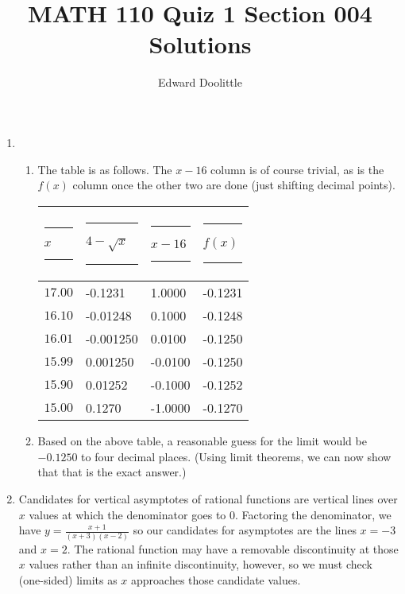 \documentclass{article}
\title{MATH 110 Quiz 1 Section 004 Solutions}
\author{Edward Doolittle}
\newcommand{\ds}{\displaystyle}
\begin{document}
\maketitle
\begin{enumerate}
\item
  \begin{enumerate}
  \item The table is as follows.  The $x-16$ column is of course trivial,
    as is the $f(x)$ column once the other two are done (just shifting
    decimal points).
    \begin{center}
      \begin{tabular}{|l|l|l|l|}
        \hline
	\rule{10pt}{0pt}$x$\rule{10pt}{0pt}     
	  & \rule{10pt}{0pt}\rule{0pt}{12pt}$4-\sqrt{x}$\rule{10pt}{0pt}
	  & \rule{10pt}{0pt}$x-16$\rule{10pt}{0pt}
	  & \rule{20pt}{0pt}$f(x)$\rule{20pt}{0pt} \\
	\hline
	\rule{0pt}{12pt}$17.00$ &   -0.1231    & 1.0000 &  -0.1231   \\
	\hline
	\rule{0pt}{12pt}$16.10$ &   -0.01248   & 0.1000 &  -0.1248   \\
	\hline
	\rule{0pt}{12pt}$16.01$ &   -0.001250  & 0.0100 &  -0.1250   \\
	\hline
	\rule{0pt}{12pt}$15.99$ &    0.001250  &-0.0100 &  -0.1250   \\
	\hline
	\rule{0pt}{12pt}$15.90$ &    0.01252   &-0.1000 &  -0.1252   \\
	\hline
	\rule{0pt}{12pt}$15.00$ &    0.1270    &-1.0000 &  -0.1270   \\
	\hline
      \end{tabular}
    \end{center}
  \item %
    Based on the above table, a reasonable guess for the limit would be
    $-0.1250$ to four decimal places.  (Using limit theorems, we can now
    show that that is the exact answer.)
  \end{enumerate}
\item %
  Candidates for vertical asymptotes of rational functions 
  are vertical lines over $x$ values at which the denominator goes to $0$.
  Factoring the denominator, we have $\ds y = \frac{x+1}{(x+3)(x-2)}$ so
  our candidates for asymptotes are the lines $x=-3$ and $x=2$.  The
  rational function may have a removable discontinuity at those $x$ values
  rather than an infinite discontinuity, however, so we must check (one-sided)
  limits as $x$ approaches those candidate values.


\end{enumerate}
\end{document}

